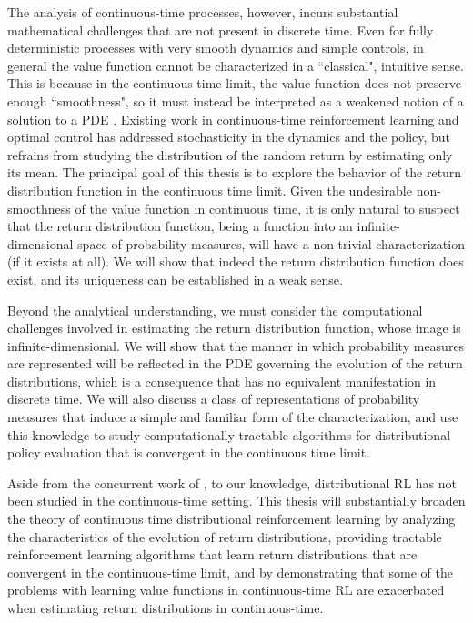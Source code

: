 The analysis of continuous-time processes, however, incurs substantial
mathematical challenges that are not present in discrete time. Even for fully
deterministic processes with very smooth dynamics and simple controls, in
general the value function cannot be characterized in a ``classical", intuitive
sense. This is because in the continuous-time limit, the value function does not
preserve enough ``smoothness", so it must instead be interpreted as a weakened
notion of a solution to a PDE \citep{crandall1983viscosity}. Existing work in
continuous-time reinforcement learning and optimal control has addressed
stochasticity in the dynamics and the policy, but refrains from studying the
distribution of the random return by estimating only its mean. The principal
goal of this thesis is to explore the behavior of the return distribution
function in the continuous time limit. Given the undesirable non-smoothness of
the value function in continuous time, it is only natural to suspect that the
return distribution function, being a function into an infinite-dimensional
space of probability measures, will have a non-trivial characterization (if it
exists at all). We will show that indeed the return distribution function does
exist, and its uniqueness can be established in a weak sense.

Beyond the analytical understanding, we must consider the computational
challenges involved in estimating the return distribution function, whose image
is infinite-dimensional. We will show that the manner in which probability
measures are represented will be reflected in the PDE governing the evolution of
the return distributions, which is a consequence that has no equivalent
manifestation in discrete time. We will also discuss a class of representations
of probability measures that induce a simple and familiar form of the
characterization, and use this knowledge to study computationally-tractable
algorithms for distributional policy evaluation that is convergent in the
continuous time limit.

Aside
from the concurrent work of \citet{halperin2021distributional}, to our
knowledge, distributional RL has not been studied in the
continuous-time setting. This thesis will substantially broaden the
theory of continuous time distributional reinforcement learning by
analyzing the characteristics of the evolution of return
distributions, providing tractable reinforcement learning algorithms
that learn return distributions that are convergent in the
continuous-time limit, and by demonstrating that some of the problems
with learning value functions in continuous-time RL are exacerbated
when estimating return distributions in continuous-time.

